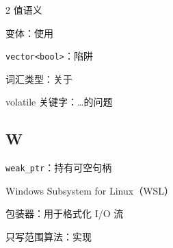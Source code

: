 \begin{multicols}{2}
\noindent 值语义\par
\noindent 变体：使用\par
\noindent \texttt{vector<\allowbreak{}bool>\allowbreak{}}：陷阱\par
\noindent 词汇类型：关于\par
\noindent volatile 关键字：…的问题\par

\subsection*{W}

\noindent \texttt{weak\_\allowbreak{}ptr}：持有可空句柄\par
\noindent Windows Subsystem for Linux（WSL）\par
\noindent 包装器：用于格式化 I/O 流\par
\noindent 只写范围算法：实现\par

\end{multicols}
